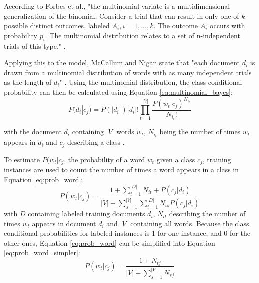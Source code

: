         
        According to Forbes et al., "the multinomial variate is a multidimensional generalization of the binomial. Consider a trial that can result in only one of $k$ possible distinct outcomes, labeled $A_i, i = 1,...,k$. The outcome $A_i$ occurs with probability $p_i$. The multinomial distribution relates to a set of n-independent trials of this type." \cite[p.~135]{evans2011statistical}.
        
        Applying this to the model, McCallum and Nigan state that "each document $d_i$ is drawn from a multinomial distribution of words with as many independent trials as the length of $d_i$" \cite[p.~3]{Mccallum1998}. Using the multinomial distribution, the class conditional probability can then be calculated using Equation \eqref{eq:multinomial_bayes}:
        \begin{equation}
            \label{eq:multinomial_bayes}
                P(d_i|c_j) = P(|d_i|)|d_i|!\prod_{t=1}^{|V|}\frac{P(w_t|c_j)^{N_{i_t}}}{N_{i_t}!}
        \end{equation}
        
        
        with the document $d_i$ containing $|V|$ words $w_t$, $N_{i_t}$ being the number of times $w_t$ appears in $d_i$ and $c_j$ describing a class \cite{Mccallum1998}. 
        
        To estimate $P(w_t|c_j$, the probability of a word $w_t$ given a class $c_j$, training instances are used to count the number of times a word appears in a class in Equation \eqref{eq:prob_word}:
        \begin{equation}
            \label{eq:prob_word}
                P(w_t|c_j) = \frac{1 + \sum_{i=1}^{|D|}N_{it} + P(c_j|d_i)}{|V| + \sum_{s=1}^{|V|} \sum_{i=1}^{|D|}N_{is} P (c_j|d_i)} 
        \end{equation}
        with $D$ containing labeled training documents $d_i$, $N_{it}$ describing the number of times $w_t$ appears in document $d_i$ and $|V|$ containing all words.
        Because the class conditional probabilities for labeled instances is 1 for one instance, and 0 for the other ones, Equation \eqref{eq:prob_word} can be simplified into Equation \eqref{eq:prob_word_simpler}:
                \begin{equation}
            \label{eq:prob_word_simpler}
                P(w_t|c_j) = \frac{1 + N_{tj}}{|V| + \sum_{s=1}^{|V|}N_{sj}} 
        \end{equation}
        

